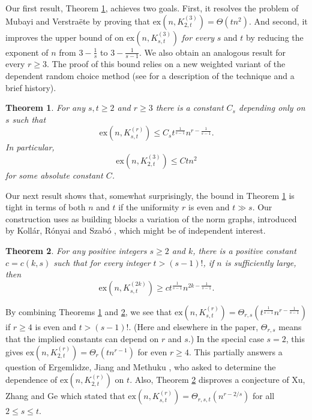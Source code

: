 \documentclass[a4paper,11pt]{article}
\newtheorem{theorem}{\bf Theorem}[section]
\theoremstyle{definition}
\def\ex{\mathrm{ex}}
\begin{document}
Our first result, Theorem \ref{thm:r-uniform bipartite}, achieves two goals. First, it resolves the problem of Mubayi and Verstra\"ete by proving that $\ex(n,K_{2,t}^{(3)})= \Theta(tn^2)$. And second, it improves the upper bound of \cite{MV04} on $\ex(n,K_{s,t}^{(3)})$  {\em for every} $s$ and $t$ by reducing the exponent of $n$ from $3 - \frac{1}{s}$ to $3 - \frac{1}{s-1}$. We also obtain an analogous result for every $r \geq 3$.  
The proof of this bound relies on a new weighted variant of the dependent random choice method (see \cite{Fox2011DependentRC} for a description of the technique and a brief history).

\begin{theorem} \label{thm:r-uniform bipartite}
	 For any $s,t\geq 2$ and $r \geq 3$ there is a constant $C_s$ depending only on $s$ such that $$\ex(n,K_{s,t}^{(r)})\leq C_{s} t^{\frac{1}{s-1}}n^{r-\frac{1}{s-1}}.$$
	 \noindent
	 In particular, $$\ex(n,K_{2,t}^{(3)})\leq Ctn^2$$ for some absolute constant $C$.
\end{theorem}

Our next result shows that, somewhat surprisingly, the bound in Theorem \ref{thm:r-uniform bipartite} is tight in terms of both $n$ and $t$ if the uniformity $r$ is even and $t \gg s$. Our construction uses as building blocks a variation of the norm graphs, introduced by Koll\'ar, R\'onyai and Szab\'o \cite{KRS96}, which might be of independent interest.

\begin{theorem} \label{thm:right dependence on t}
     For any positive integers $s\geq 2$ and $k$, there is a positive constant $c=c(k,s)$ such that for every integer $t>(s-1)!$, if $n$ is sufficiently large, then
     $$\ex(n,K_{s,t}^{(2k)})\geq ct^{\frac{1}{s-1}}n^{2k-\frac{1}{s-1}}.$$
\end{theorem}
By combining Theorems \ref{thm:r-uniform bipartite} and \ref{thm:right dependence on t}, we see that 
$\ex(n,K_{s,t}^{(r)}) = \Theta_{r,s}(t^{\frac{1}{s-1}}n^{r-\frac{1}{s-1}})$ if $r\geq 4$ is even and $t > (s-1)!$. (Here and elsewhere in the paper, $\Theta_{r,s}$ means that the implied constants can depend on $r$ and $s$.) In the special case $s = 2$, this gives $\ex(n,K_{2,t}^{(r)}) = \Theta_r(t n^{r-1})$ for even $r\geq 4$. This partially answers a question of Ergemlidze, Jiang and Methuku \cite{EJM20}, who asked to determine the dependence of $\ex(n,K_{2,t}^{(r)})$ on $t$.  
Also, Theorem \ref{thm:right dependence on t} disproves a conjecture of Xu, Zhang and Ge \cite[Conjecture 5.1]{XZG21} which stated that $\ex(n,K_{s,t}^{(r)}) = \Theta_{r,s,t}(n^{r-2/s})$ for all $2 \leq s \leq t$.  
\end{document}
